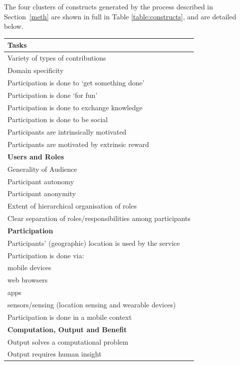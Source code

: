 \documentclass{sig-alternate}
\begin{document}
The four clusters of constructs generated by the process described in Section~\ref{meth}
are shown in full in Table \ref{table:constructs}, and are detailed below.


\begin{table}[htb]
\begin{center}
\begin{tabular}{|p{8cm}|}
\hline
{\bf Tasks} \\
\hline
Variety of types of contributions \\
Domain specificity \\
Participation is done to `get something done' \\
Participation is done `for fun' \\
Participation is done to exchange knowledge \\
Participation is done to be social \\
Participants are intrinsically motivated \\
Participants are motivated by extrinsic reward \\
\hline
{\bf Users and Roles} \\
\hline
Generality of Audience \\
Participant autonomy \\
Participant anonymity \\
Extent of hierarchical organisation of roles \\
Clear separation of roles/responsibilities among participants \\
\hline
{\bf Participation} \\
\hline
Participants' (geographic) location is used by the service \\
Participation is done via: \\
\hspace{1cm} mobile devices \\
\hspace{1cm} web browsers \\
\hspace{1cm} apps \\
\hspace{1cm} sensors/sensing (location sensing and wearable devices) \\
Participation is done in a mobile context \\
\hline
{\bf Computation, Output and Benefit} \\
\hline
Output solves a computational problem \\
Output requires human insight \\

\end{tabular}
\end{center}
\end{table}
\end{document}
